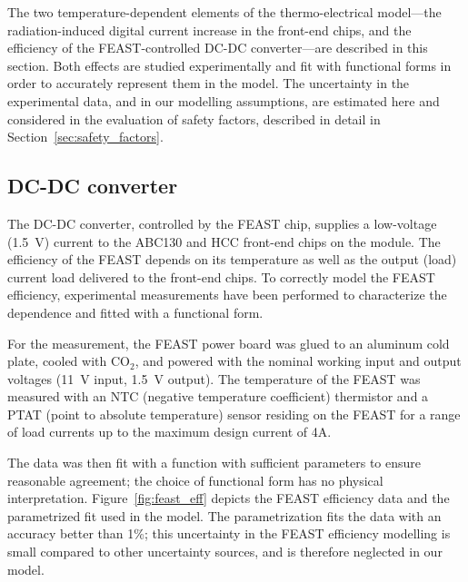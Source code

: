 
The two temperature-dependent elements of the thermo-electrical model---the
radiation-induced digital current increase in the front-end chips, and the
efficiency of the FEAST-controlled DC-DC converter---are described in this section.
Both effects are studied experimentally and fit with functional forms
in order to accurately represent them in the model.
The uncertainty in the experimental data, and in our modelling assumptions,
are estimated here and considered in the evaluation of safety factors,
described in detail in Section~\ref{sec:safety_factors}.

\subsection{DC-DC converter}

The DC-DC converter, controlled by the FEAST chip, supplies a low-voltage (1.5~V) current to the ABC130 and HCC front-end
chips on the module.
The efficiency of the FEAST depends on its temperature as well as the output (load) current
load delivered to the front-end chips. To correctly model the FEAST efficiency, experimental
measurements have been performed to characterize the dependence and fitted with a functional form.

For the measurement, the FEAST power board was glued to an aluminum cold plate, cooled
with CO$_2$, and powered with the nominal working input and output voltages (11~V input, 1.5~V output).
The temperature of the FEAST was measured with an NTC (negative temperature coefficient) thermistor and a PTAT (point to absolute temperature) sensor residing on the FEAST
for a range of load currents up to the maximum design current of 4A.

The data was then fit with a function with sufficient parameters to ensure reasonable agreement; the
choice of functional form has no physical interpretation. Figure~\ref{fig:feast_eff} depicts the
FEAST efficiency data and the parametrized fit used in the model. The parametrization fits the data
with an accuracy better than 1\%; this uncertainty in the FEAST efficiency modelling is small
compared to other uncertainty sources, and is therefore neglected in our model.

